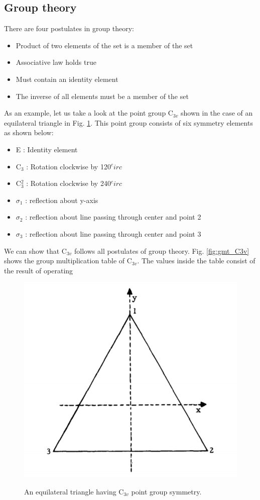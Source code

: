 \documentclass[10pt,doublespacing,edeposit]{uiucthesis2020}
\begin{document}
\begin{mainmatter}
\subsection{Group theory}


There are four postulates in group theory:

\begin{itemize}
\item Product of two elements of the set is a member of the set
\item Associative law holds true
\item Must contain an identity element
\item The inverse of all elements must be a member of the set
\end{itemize}

As an example, let us take a look at the point group C$_{3v}$ shown in the case of an equilateral triangle in Fig. \ref{fig:C3v}. This point group consists of six symmetry elements as shown below:

\begin{itemize}
\item E : Identity element
\item C$_3$ : Rotation clockwise by 120$^circ$
\item C$_3^2$ : Rotation clockwise by 240$^circ$
\item $\sigma_1$ : reflection about y-axis
\item $\sigma_2$ : reflection about line passing through center and point 2
\item $\sigma_3$ : reflection about line passing through center and point 3
\end{itemize}

We can show that C$_{3v}$ follows all postulates of group theory. Fig. \ref{fig:gmt_C3v} shows the group multiplication table of C$_{3v}$. The values inside the table consist of the result of operating 

\begin{figure}
\centering\includegraphics[width=0.5\columnwidth]{figures/ch4/C3v.png} \\
\caption{\label{fig:C3v}
An equilateral triangle having C$_{3v}$ point group symmetry.
}
\end{figure}


\end{mainmatter}
\end{document}

